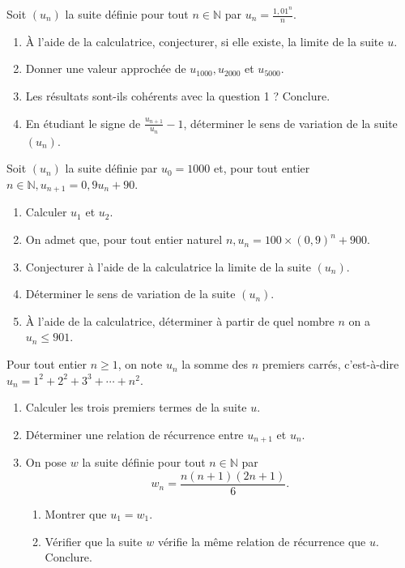 \documentclass[11pt]{article}
\begin{document}
\begin{exo}
  Soit $\left(u_{n}\right)$ la suite définie pour tout $n \in \mathbb{N}$ par
  $u_{n}=\frac{1,01^{n}}{n}$.
\begin{enumerate}
  \item À l'aide de la calculatrice, conjecturer, si elle existe, la limite de
    la suite $u$.
  \item Donner une valeur approchée de $u_{1000}, u_{2000}$ et $u_{5000}$.
  \item Les résultats sont-ils cohérents avec la question 1 ? Conclure.
  \item En étudiant le signe de $\frac{u_{n+1}}{u_{n}}-1$, déterminer le sens de
    variation de la suite $\left(u_{n}\right)$.
\end{enumerate}
\end{exo}

\begin{exo}
  Soit $\left(u_{n}\right)$ la suite définie par $u_{0}=1000$ et, pour tout
  entier $n \in \mathbb{N}, u_{n+1}=0,9 u_{n}+90$.
\begin{enumerate}
  \item Calculer $u_{1}$ et $u_{2}$.
  \item On admet que, pour tout entier naturel $n, u_{n}=100
    \times(0,9)^{n}+900$.
  \item Conjecturer à l'aide de la calculatrice la limite de la suite
    $\left(u_{n}\right)$.
  \item Déterminer le sens de variation de la suite $\left(u_{n}\right)$.
  \item À l'aide de la calculatrice, déterminer à partir de quel nombre $n$ on a
    $u_{n} \leq 901$.
\end{enumerate}
\end{exo}

\begin{exo}[$\star\star$]
  Pour tout entier $n \geq 1$, on note $u_{n}$ la somme des $n$ premiers carrés,
  c'est-à-dire $u_{n}=1^{2}+2^{2}+3^{3}+\cdots+n^{2}$.
\begin{enumerate}
  \item Calculer les trois premiers termes de la suite $u$.
  \item Déterminer une relation de récurrence entre $u_{n+1}$ et $u_{n}$.
  \item On pose $w$ la suite définie pour tout $n \in \mathbb{N}$ par
\[
w_{n}=\frac{n(n+1)(2n+1)}{6} .
\]
\begin{enumerate}
  \item  Montrer que $u_{1}=w_{1}$.
  \item Vérifier que la suite $w$ vérifie la même relation de récurrence que
    $u$. Conclure.
\end{enumerate}
\end{enumerate}
\end{exo}
\end{document}
